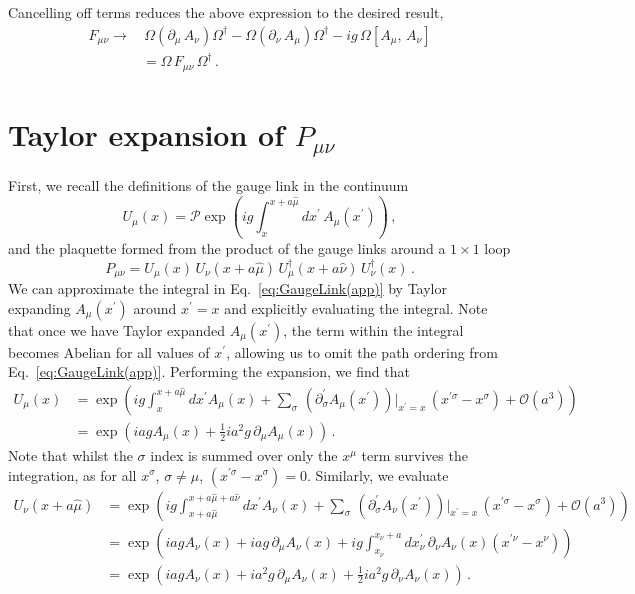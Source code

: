 Cancelling off terms reduces the above expression to the desired result,
%
\begin{align*}
F_{\mu\nu} \rightarrow &\, \Omega\left(\partial_\mu\,A_\nu\right)\Omega^\dagger - \Omega\left(\partial_\nu\,A_\mu\right)\Omega^\dagger -ig\,\Omega\left[A_\mu,\,A_\nu\right]\\
&= \Omega\,F_{\mu\nu}\,\Omega^\dagger\, .
\end{align*}


\section{Taylor expansion of $P_{\mu\nu}$}\label{app:TEPlaquette}
First, we recall the definitions of the gauge link in the continuum
%
\begin{equation}
U_\mu(x) = \mathcal{P}\exp\left(ig\int_x^{x+a\hat{\mu}}dx^\prime \, A_\mu(x^\prime)\right)  \, ,
\label{eq:GaugeLink(app)}
\end{equation}
%
and the plaquette formed from the product of the gauge links around a $1\times 1$ loop
\begin{equation}
P_{\mu\nu} = U_\mu(x)\,U_\nu(x+a\hat{\mu})\,U^\dagger_\mu(x+a\hat{\nu})\,U^\dagger_\nu(x)\, .
\label{eq:Plaquette(app)}
\end{equation}
%
We can approximate the integral in Eq.~\ref{eq:GaugeLink(app)} by Taylor expanding $A_\mu(x^\prime)$ around $x^\prime=x$ and explicitly evaluating the integral. Note that once we have Taylor expanded $A_\mu(x^\prime)$, the term within the integral becomes Abelian for all values of $x^\prime$, allowing us to omit the path ordering from Eq.~\ref{eq:GaugeLink(app)}. Performing the expansion, we find that
%
\begin{align}
U_\mu(x)&=\exp\left(ig\int_x^{x+a\hat{\mu}} dx^\prime A_\mu\left(x\right) + \sum_\sigma \, \left(\partial^\prime_\sigma A_\mu(x^\prime)\right)\big|_{x^\prime = x}\,(x^{\prime\sigma} - x^\sigma) + \mathcal{O}(a^3)\right)\nonumber\\
&=\exp\left(iag A_\mu\left(x\right) + \frac{1}{2}ia^2 g\, \partial_\mu A_\mu\left(x\right)\right)\, . \label{eq:UTaylor}
\end{align}
%
Note that whilst the $\sigma$ index is summed over only the $x^\mu$ term survives the integration, as for all $x^\sigma$, $\sigma\neq \mu$, $(x^{\prime\sigma}-x^\sigma)=0$. Similarly, we evaluate
%
\begin{align}
U_\nu(x+a\hat{\mu}) &= \exp\left(ig\int_{x+a\hat{\mu}}^{x+a\hat{\mu}+a\hat{\nu}} dx^\prime A_\nu\left(x\right) + \sum_\sigma\,\left(\partial^\prime_\sigma A_\nu(x^\prime)\right)\big|_{x^\prime = x}\,(x^{\prime\sigma} - x^\sigma) + \mathcal{O}(a^3)\right)\nonumber\\
&= \exp\left( iag A_\nu(x) + iag\,\partial_\mu A_\nu (x) + ig\int_{x_\nu}^{x_\nu+a} dx^\prime_\nu \, \partial_\nu A_\nu (x) (x^{\prime\nu} - x^\nu)\right)\nonumber\\
&= \exp\left(iag A_\nu(x) + ia^2g\,\partial_\mu A_\nu(x) + \frac{1}{2}ia^2 g\,\partial_\nu A_\nu(x)\right)\, . \label{eq:UTaylor2}
\end{align}

